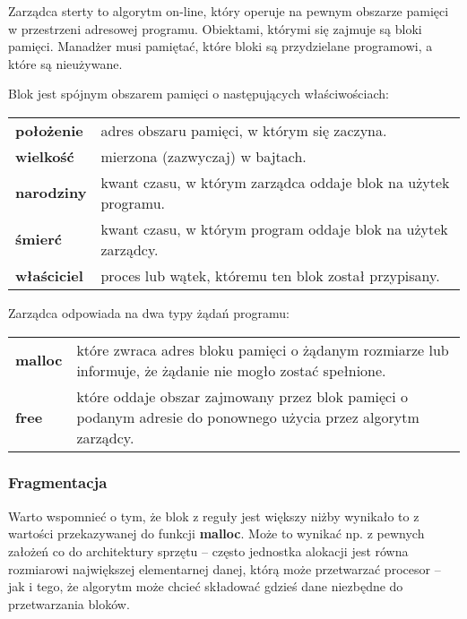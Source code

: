 \documentclass[12pt,a4paper,titlepage,twoside]{mwart}
\begin{document}
Zarządca sterty to algorytm on-line, który operuje na pewnym obszarze pamięci
w przestrzeni adresowej programu. Obiektami, którymi się zajmuje są bloki
pamięci. Manadżer musi pamiętać, które bloki są przydzielane programowi, a
które są nieużywane.

\parbox{\textwidth}{
Blok jest spójnym obszarem pamięci o następujących właściwościach:
\par\vspace{2mm}
\begin{tabularx}{\textwidth}{@{\hspace{4ex}}lX@{}}
	\textbf{położenie}	& adres obszaru pamięci, w którym się zaczyna. \\
	\textbf{wielkość}	& mierzona (zazwyczaj) w bajtach. \\
	\textbf{narodziny}	& kwant czasu, w którym zarządca oddaje blok na użytek programu. \\
	\textbf{śmierć}		& kwant czasu, w którym program oddaje blok na użytek zarządcy. \\
	\textbf{właściciel}	& proces lub wątek, któremu ten blok został przypisany. \\
\end{tabularx}
}

\parbox{\textwidth}{
Zarządca odpowiada na dwa typy żądań programu:
\par\vspace{2mm}
\begin{tabularx}{\textwidth}{@{\hspace{4ex}}lX@{}}
	\textbf{malloc} & które zwraca adres bloku pamięci o żądanym
	rozmiarze lub informuje, że żądanie nie mogło zostać spełnione. \\

	\textbf{free} & które oddaje obszar zajmowany przez blok pamięci o
	podanym adresie do ponownego użycia przez algorytm zarządcy. \\
\end{tabularx}
}

\subsubsection{Fragmentacja}

Warto wspomnieć o tym, że blok z reguły jest większy niżby wynikało to z
wartości przekazywanej do funkcji \textbf{malloc}.  Może to wynikać np. z
pewnych założeń co do architektury sprzętu -- często jednostka alokacji jest
równa rozmiarowi największej elementarnej danej, którą może przetwarzać
procesor -- jak i tego, że algorytm może chcieć składować gdzieś dane niezbędne
do przetwarzania bloków.
\end{document}
